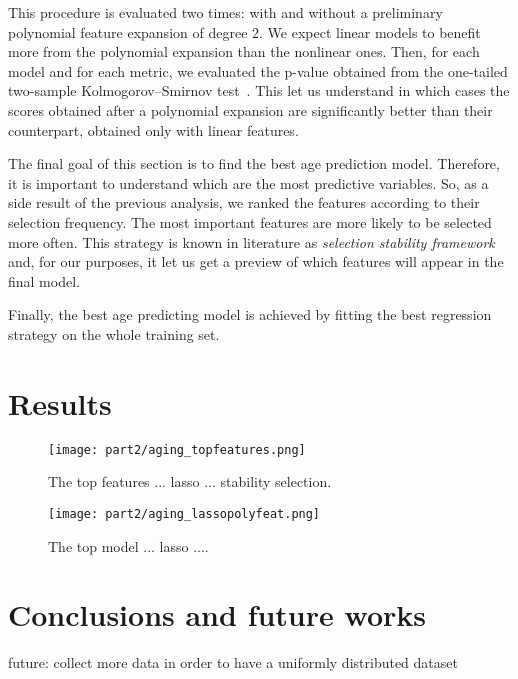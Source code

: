 This procedure is evaluated two times: with and without a preliminary polynomial feature expansion of degree $2$. We expect linear models to benefit more from the polynomial expansion than the nonlinear ones.
Then, for each model and for each metric, we evaluated the p-value obtained from the one-tailed two-sample Kolmogorov–Smirnov test~\cite{everitt2002cambridge}. This let us understand in which cases the scores obtained after a polynomial expansion are significantly better than their counterpart, obtained only with  linear features.

The final goal of this section is to find the best age prediction model. Therefore, it is important to understand which are the most predictive variables.
So, as a side result of the previous analysis, we ranked the features according to their selection frequency. The most important features are more likely to be selected more often. This strategy is known in literature as  \textit{selection stability framework}~\cite{meinshausen2010stability, barbieri16palladio} and, for our purposes, it let us get a preview of which features will appear in the final model.

Finally, the best age predicting model is achieved by fitting the best regression strategy on the whole training set.

\section{Results} \label{sec:frassoni_results}




\begin{figure}[]
	\centering
	\texttt{[image: part2/aging\_topfeatures.png]}
	\caption{The top features ... lasso ... stability selection.} \label{fig:frassoni_topfeat}
\end{figure}


\begin{figure}[]
	\centering
	\texttt{[image: part2/aging\_lassopolyfeat.png]}
	\caption{The top model ... lasso ....} \label{fig:frassoni_topmodel}
\end{figure}



\section{Conclusions and future works} \label{sec:frassoni_conclusions}

future: collect more data in order to have a uniformly distributed dataset


